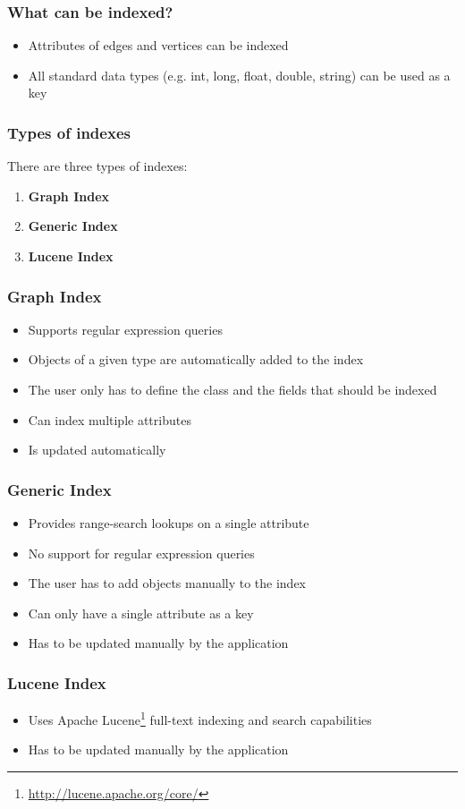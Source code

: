 
\begin{frame}
\frametitle{What can be indexed?}
\begin{itemize}
		\item Attributes of edges and vertices can be indexed
		\item All standard data types (e.g. int, long, float, double, string) can be used as a key		
\end{itemize}
\end{frame} 

\begin{frame}
\frametitle{Types of indexes}
There are three types of indexes:

\begin{enumerate}
	\item \textbf{Graph Index}
	\item \textbf{Generic Index}
	\item \textbf{Lucene Index}
\end{enumerate}
\end{frame} 

\begin{frame}
\frametitle{Graph Index}
\begin{itemize}
	\item Supports regular expression queries
	\item Objects of a given type are automatically added to the index
	\item The user only has to define the class and the fields that should be indexed
	\item Can index multiple attributes
	\item Is updated automatically
\end{itemize}
\end{frame} 

\begin{frame}
\frametitle{Generic Index}
\begin{itemize}
	\item Provides range-search lookups on a single attribute
	\item No support for regular expression queries
	\item The user has to add objects manually to the index
	\item Can only have a single attribute as a key
	\item Has to be updated manually by the application 
\end{itemize}
\end{frame} 

\begin{frame}
\frametitle{Lucene Index}
\begin{itemize}
	\item Uses Apache Lucene\footnote{\url{http://lucene.apache.org/core/}} full-text indexing and search capabilities
	\item Has to be updated manually by the application
\end{itemize}
\end{frame}